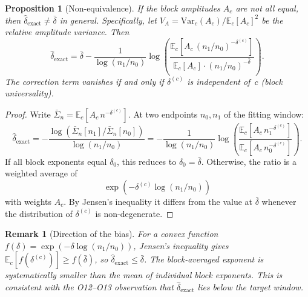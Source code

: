 \documentclass[11pt,a4paper]{article}
\newtheorem{proposition}[theorem]{Proposition}
\newtheorem{remark}[theorem]{Remark}
\newcommand{\Sn}{\bar{\Sigma}_n}
\newcommand{\dexact}{\hat{\delta}_{\mathrm{exact}}}
\begin{document}
\begin{proposition}[Non-equivalence]
\label{prop:noneq}
If the block amplitudes $A_c$ are not all equal,
then $\dexact \neq \bar{\delta}$ in general.
Specifically, let $V_A = \mathrm{Var}_c(A_c) / \mathbb{E}_c[A_c]^2$
be the relative amplitude variance.
Then
\begin{equation}
\label{eq:noneq}
\dexact = \bar{\delta}
- \frac{1}{\log(n_1/n_0)}
\log\!\left(
\frac{\mathbb{E}_c[A_c \, (n_1/n_0)^{-\delta^{(c)}}]}
{\mathbb{E}_c[A_c] \cdot (n_1/n_0)^{-\bar{\delta}}}
\right).
\end{equation}
The correction term vanishes if and only if $\delta^{(c)}$ is independent
of~$c$ (block universality).
\end{proposition}

\begin{proof}
Write $\Sn = \mathbb{E}_c[A_c \, n^{-\delta^{(c)}}]$.
At two endpoints $n_0, n_1$ of the fitting window:
\[
\dexact
= -\frac{\log(\Sn[n_1] / \Sn[n_0])}{\log(n_1 / n_0)}
= -\frac{1}{\log(n_1/n_0)}
\log\!\left(
\frac{\mathbb{E}_c[A_c \, n_1^{-\delta^{(c)}}]}
{\mathbb{E}_c[A_c \, n_0^{-\delta^{(c)}}]}
\right).
\]
If all block exponents equal $\delta_0$, this reduces to
$\delta_0=\bar\delta$.
Otherwise, the ratio is a weighted average of
\[
  \exp\!\left(-\delta^{(c)}\log(n_1/n_0)\right)
\]
with weights $A_c$.
By Jensen's inequality it differs from the value at $\bar\delta$ whenever the distribution of
$\delta^{(c)}$ is non-degenerate.
\end{proof}

\begin{remark}[Direction of the bias]
\label{rem:bias}
For a convex function $f(\delta) = \exp(-\delta \log(n_1/n_0))$,
Jensen's inequality gives
$\mathbb{E}_c[f(\delta^{(c)})] \geq f(\bar{\delta})$,
so $\dexact \leq \bar{\delta}$.
The block-averaged exponent is systematically \emph{smaller}
than the mean of individual block exponents.
This is consistent with the O12--O13 observation that $\dexact$
lies below the target window.
\end{remark}
\end{document}
